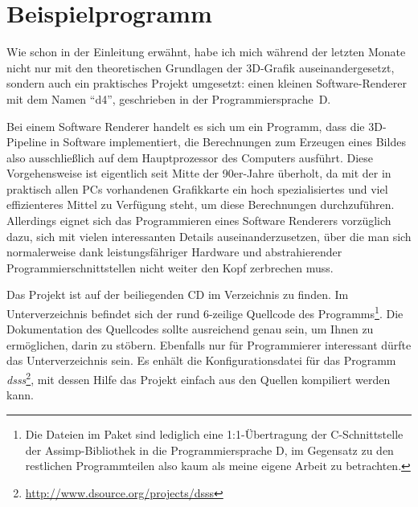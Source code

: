 \chapter{Beispielprogramm}
\label{beispielprogramm}

Wie schon in der Einleitung erwähnt, habe ich mich während der letzten Monate nicht nur mit den theoretischen Grundlagen der 3D-Grafik auseinandergesetzt, sondern auch ein praktisches Projekt umgesetzt: einen kleinen Software-Renderer mit dem Namen \enquote{d4}, geschrieben in der Programmiersprache~D.

Bei einem Software Renderer handelt es sich um ein Programm, dass die 3D-Pipeline in Software implementiert, die Berechnungen zum Erzeugen eines Bildes also ausschließlich auf dem Hauptprozessor des Computers ausführt. Diese Vorgehensweise ist eigentlich seit Mitte der 90er-Jahre überholt, da mit der in praktisch allen PCs vorhandenen Grafikkarte ein hoch spezialisiertes und viel effizienteres Mittel zu Verfügung steht, um diese Berechnungen durchzuführen. Allerdings eignet sich das Programmieren eines Software Renderers vorzüglich dazu, sich mit vielen interessanten Details auseinanderzusetzen, über die man sich normalerweise dank leistungsfähriger Hardware und abstrahierender Programmierschnittstellen nicht weiter den Kopf zerbrechen muss.

Das Projekt ist auf der beiliegenden CD im Verzeichnis  zu finden. Im Unterverzeichnis  befindet sich der rund 6-zeilige Quellcode des Programms\footnote{Die Dateien im Paket  sind lediglich eine 1:1-Übertragung der C-Schnittstelle der Assimp-Bibliothek in die Programmiersprache D, im Gegensatz zu den restlichen Programmteilen also kaum als meine eigene Arbeit zu betrachten.}. Die Dokumentation des Quellcodes sollte ausreichend genau sein, um Ihnen zu ermöglichen, darin zu stöbern. Ebenfalls nur für Programmierer interessant dürfte das Unterverzeichnis  sein. Es enhält die Konfigurationsdatei für das Programm \emph{dsss}\footnote{\url{http://www.dsource.org/projects/dsss}}, mit dessen Hilfe das Projekt einfach aus den Quellen kompiliert werden kann.

